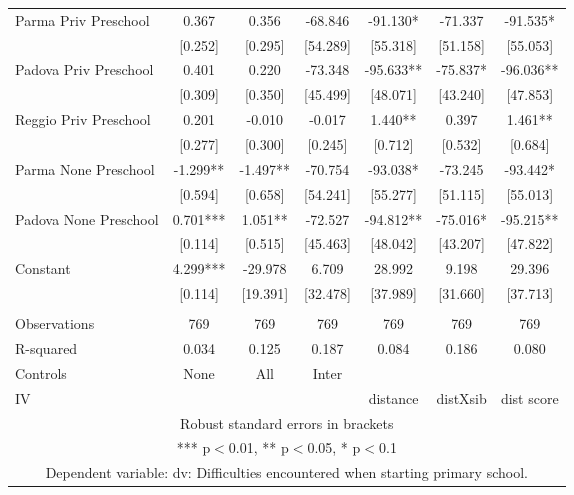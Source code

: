 \begin{tabular}{lcccccc}
Parma Priv Preschool & 0.367 & 0.356 & -68.846 & -91.130* & -71.337 & -91.535* \\
 & [0.252] & [0.295] & [54.289] & [55.318] & [51.158] & [55.053] \\
Padova Priv Preschool & 0.401 & 0.220 & -73.348 & -95.633** & -75.837* & -96.036** \\
 & [0.309] & [0.350] & [45.499] & [48.071] & [43.240] & [47.853] \\
Reggio Priv Preschool & 0.201 & -0.010 & -0.017 & 1.440** & 0.397 & 1.461** \\
 & [0.277] & [0.300] & [0.245] & [0.712] & [0.532] & [0.684] \\
Parma None Preschool & -1.299** & -1.497** & -70.754 & -93.038* & -73.245 & -93.442* \\
 & [0.594] & [0.658] & [54.241] & [55.277] & [51.115] & [55.013] \\
Padova None Preschool & 0.701*** & 1.051** & -72.527 & -94.812** & -75.016* & -95.215** \\
 & [0.114] & [0.515] & [45.463] & [48.042] & [43.207] & [47.822] \\
Constant & 4.299*** & -29.978 & 6.709 & 28.992 & 9.198 & 29.396 \\
 & [0.114] & [19.391] & [32.478] & [37.989] & [31.660] & [37.713] \\
 &  &  &  &  &  &  \\
Observations & 769 & 769 & 769 & 769 & 769 & 769 \\
R-squared & 0.034 & 0.125 & 0.187 & 0.084 & 0.186 & 0.080 \\
Controls & None & All & Inter &  &  &  \\
 IV &  &  &  & distance & distXsib & dist score \\ \hline
\multicolumn{7}{c}{ Robust standard errors in brackets} \\
\multicolumn{7}{c}{ *** p$<$0.01, ** p$<$0.05, * p$<$0.1} \\
\multicolumn{7}{c}{ Dependent variable: dv: Difficulties encountered when starting primary school.} \\
\end{tabular}
